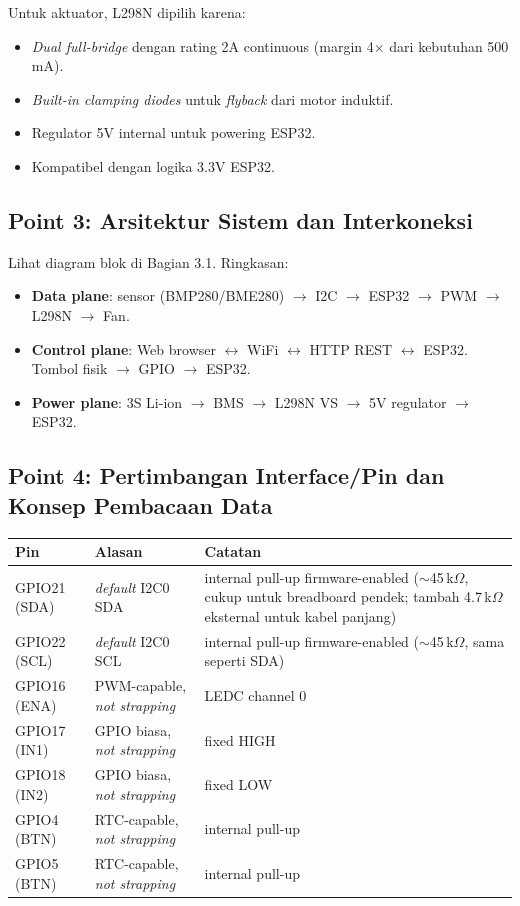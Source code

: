 \documentclass[11pt,a4paper]{article}
\begin{document}
Untuk aktuator, L298N dipilih karena:
\begin{itemize}
    \item \emph{Dual full-bridge} dengan rating 2A continuous (margin 4$\times$ dari kebutuhan 500\,mA).
    \item \emph{Built-in clamping diodes} untuk \emph{flyback} dari motor induktif.
    \item Regulator 5V internal untuk powering ESP32.
    \item Kompatibel dengan logika 3.3V ESP32.
\end{itemize}

\subsection{Point 3: Arsitektur Sistem dan Interkoneksi}

Lihat diagram blok di Bagian 3.1. Ringkasan:
\begin{itemize}
    \item \textbf{Data plane}: sensor (BMP280/BME280) $\rightarrow$ I2C $\rightarrow$ ESP32 $\rightarrow$ PWM $\rightarrow$ L298N $\rightarrow$ Fan.
    \item \textbf{Control plane}: Web browser $\leftrightarrow$ WiFi $\leftrightarrow$ HTTP REST $\leftrightarrow$ ESP32. Tombol fisik $\rightarrow$ GPIO $\rightarrow$ ESP32.
    \item \textbf{Power plane}: 3S Li-ion $\rightarrow$ BMS $\rightarrow$ L298N VS $\rightarrow$ 5V regulator $\rightarrow$ ESP32.
\end{itemize}

\subsection{Point 4: Pertimbangan Interface/Pin dan Konsep Pembacaan Data}

\begin{center}
\begin{tabular}{lll}
\toprule
\textbf{Pin} & \textbf{Alasan} & \textbf{Catatan} \\
\midrule
GPIO21 (SDA) & \emph{default} I2C0 SDA & internal pull-up firmware-enabled ($\sim$45\,k$\Omega$, cukup untuk breadboard pendek; tambah 4.7\,k$\Omega$ eksternal untuk kabel panjang) \\
GPIO22 (SCL) & \emph{default} I2C0 SCL & internal pull-up firmware-enabled ($\sim$45\,k$\Omega$, sama seperti SDA) \\
GPIO16 (ENA) & PWM-capable, \emph{not strapping} & LEDC channel 0 \\
GPIO17 (IN1) & GPIO biasa, \emph{not strapping} & fixed HIGH \\
GPIO18 (IN2) & GPIO biasa, \emph{not strapping} & fixed LOW \\
GPIO4  (BTN) & RTC-capable, \emph{not strapping} & internal pull-up \\
GPIO5  (BTN) & RTC-capable, \emph{not strapping} & internal pull-up \\
\bottomrule
\end{tabular}
\end{center}
\end{document}
